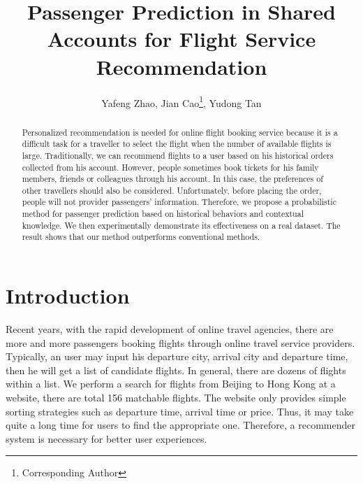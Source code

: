 \documentclass{llncs}
\begin{document}
\title{Passenger Prediction in Shared Accounts for Flight Service Recommendation}

%


\author{Yafeng Zhao, Jian Cao\thanks{Corresponding Author}, Yudong Tan}


\maketitle
\begin{abstract}
Personalized recommendation is needed for online flight booking service because it is a difficult task for a traveller to select the flight when the number of available flights is large. Traditionally, we can recommend flights to a user based on his historical orders collected from his account. However, people sometimes book tickets for his family members, friends or colleagues through his account. In this case, the preferences of other travellers should also be considered. Unfortunately, before placing the order, people will not provider passengers' information. Therefore, we propose a probabilistic method for passenger prediction based on historical behaviors and contextual knowledge. We then experimentally demonstrate its effectiveness on a real dataset. The result shows that our method outperforms conventional methods.\\
\end{abstract}


\section{Introduction}
\label{sec:intro}
Recent years, with the rapid development of online travel agencies, there are more and more passengers booking flights through online travel service providers. Typically, an user may input his departure city, arrival city and departure time, then he will get a list of candidate flights. In general, there are dozens of flights within a list. We perform a search for flights from Beijing to Hong Kong at a website, there are total 156 matchable flights. The website only provides simple sorting strategies such as departure time, arrival time or price. Thus, it may take quite a long time for users to find the appropriate one. Therefore, a recommender system is necessary for better user experiences.
\end{document}
